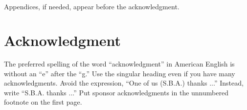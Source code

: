 \documentclass[journal]{IEEEtran}
\begin{document}
\appendices
\section{}
Appendices, if needed, appear before the acknowledgment.

\section*{Acknowledgment}
The preferred spelling of the word ``acknowledgment'' in American English is without an ``e'' after the ``g.'' Use the singular heading even if you have many acknowledgments. Avoid the expression, ``One of us (S.B.A.) thanks ...'' Instead, write ``S.B.A. thanks ...'' Put sponsor acknowledgments in the unnumbered footnote on the first page.



%
%
%




\end{document}
